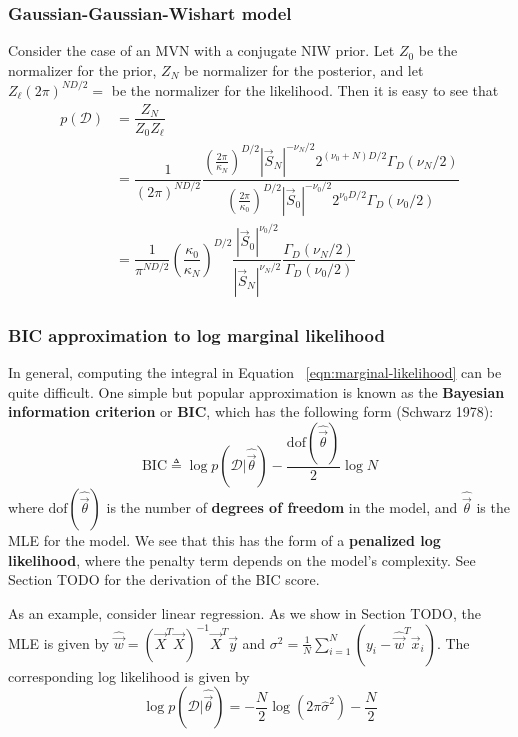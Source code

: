 \subsubsection{Gaussian-Gaussian-Wishart model}
Consider the case of an MVN with a conjugate NIW prior. Let $Z_0$ be the normalizer for the prior, $Z_N$ be normalizer for the posterior, and let $Z_{\ell}(2\pi)^{ND/2}=$ be the normalizer for the likelihood. Then it is easy to see that
\begin{align}
p(\mathcal{D})& =\dfrac{Z_N}{Z_0Z_{\ell}} \\
   & = \dfrac{1}{(2\pi)^{ND/2}}\dfrac{\left(\frac{2\pi}{\kappa_N}\right)^{D/2}|\vec{S}_N|^{-\nu_N/2}2^{(\nu_0+N)D/2}\Gamma_D(\nu_N/2)}{\left(\frac{2\pi}{\kappa_0}\right)^{D/2}|\vec{S}_0|^{-\nu_0/2}2^{\nu_0D/2}\Gamma_D(\nu_0/2)} \\
   & = \dfrac{1}{\pi^{ND/2}}\left(\dfrac{\kappa_0}{\kappa_N}\right)^{D/2}\dfrac{|\vec{S}_0|^{\nu_0/2}}{|\vec{S}_N|^{\nu_N/2}}\dfrac{\Gamma_D(\nu_N/2)}{\Gamma_D(\nu_0/2)}
\end{align}

\subsubsection{BIC approximation to log marginal likelihood}
In general, computing the integral in Equation ~\eqref{eqn:marginal-likelihood} can be quite difficult. One simple but popular approximation is known as the \textbf{Bayesian information criterion} or \textbf{BIC}, which has the following form (Schwarz 1978):
\begin{equation}
\mathrm{BIC} \triangleq \log p(\mathcal{D}|\hat{\vec{\theta}})-\dfrac{\mathrm{dof}(\hat{\vec{\theta}})}{2}\log{N}
\end{equation}
where $\mathrm{dof}(\hat{\vec{\theta}})$ is the number of \textbf{degrees of freedom} in the model, and $\hat{\vec{\theta}}$ is the MLE for the model. We see that this has the form of a \textbf{penalized log likelihood}, where the penalty term depends on the model’s complexity. See Section TODO for the derivation of the BIC score.

As an example, consider linear regression. As we show in Section TODO, the MLE is given by $\hat{\vec{w}}=(\vec{X}^T\vec{X})^{-1}\vec{X}^T\vec{y}$ and $\sigma^2=\frac{1}{N}\sum_{i=1}^N (y_i-\hat{\vec{w}}^T\vec{x}_i)$. The corresponding log likelihood is given by
\begin{equation}
\log p(\mathcal{D}|\hat{\vec{\theta}}) = -\dfrac{N}{2}\log(2\pi\hat{\sigma}^2)-\dfrac{N}{2}
\end{equation}

